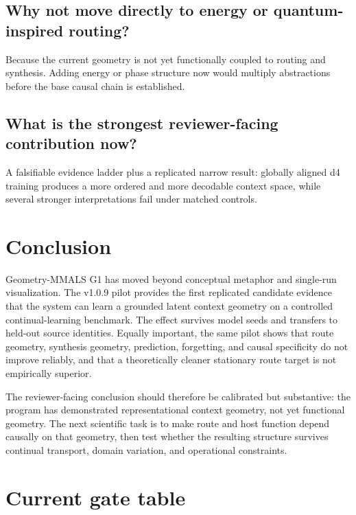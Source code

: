 \documentclass[11pt,a4paper]{article}
\begin{document}
\subsection*{Why not move directly to energy or quantum-inspired routing?}

Because the current geometry is not yet functionally coupled to routing and synthesis. Adding energy or phase structure now would multiply abstractions before the base causal chain is established.

\subsection*{What is the strongest reviewer-facing contribution now?}

A falsifiable evidence ladder plus a replicated narrow result: globally aligned d4 training produces a more ordered and more decodable context space, while several stronger interpretations fail under matched controls.

\section{Conclusion}

Geometry-MMALS G1 has moved beyond conceptual metaphor and single-run visualization. The v1.0.9 pilot provides the first replicated candidate evidence that the system can learn a grounded latent context geometry on a controlled continual-learning benchmark. The effect survives model seeds and transfers to held-out source identities. Equally important, the same pilot shows that route geometry, synthesis geometry, prediction, forgetting, and causal specificity do not improve reliably, and that a theoretically cleaner stationary route target is not empirically superior.

The reviewer-facing conclusion should therefore be calibrated but substantive: the program has demonstrated representational context geometry, not yet functional geometry. The next scientific task is to make route and host function depend causally on that geometry, then test whether the resulting structure survives continual transport, domain variation, and operational constraints.

\appendix

\section{Current gate table}
\end{document}
